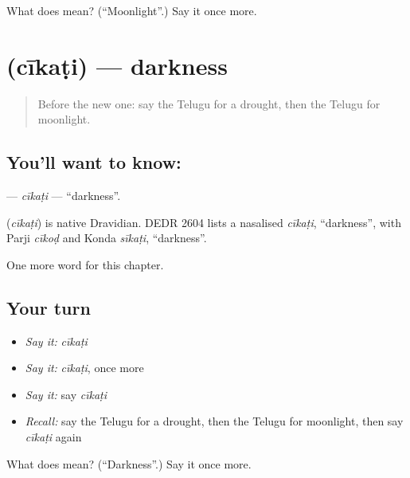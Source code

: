 \begin{tcolorbox}[breakable,colback=teal!4,colframe=teal!35!black,title={Before you move on}]
What does  mean? (\textquotedblleft{}Moonlight\textquotedblright{}.) Say it once more.
\end{tcolorbox}
\section[\texorpdfstring{\te{చీకటి} (cīkaṭi)}{చీకటి (cīkaṭi)}]{ (cīkaṭi) — darkness}

\label{lesson:TE-C267-cikati}



\begin{quote}
Before the new one: say the Telugu for a drought, then the Telugu for moonlight.
\end{quote}

\subsection*{You'll want to know: }
\textbf{} — \emph{cīkaṭi} — \textquotedblleft{}darkness\textquotedblright{}.

\begin{cousinweb}
\textbf{} (\emph{cīkaṭi}) is native Dravidian. DEDR 2604 lists a nasalised \emph{cīkaṭi}, \textquotedblleft{}darkness\textquotedblright{}, with Parji \emph{cīkoḍ} and Konda \emph{sīkaṭi}, \textquotedblleft{}darkness\textquotedblright{}.
\end{cousinweb}

\begin{grammarlens}[title={What you've built}]
One more word for this chapter.
\end{grammarlens}

\subsection*{Your turn}
\begin{itemize}
\raggedright
  \item \emph{Say it:} \emph{cīkaṭi}
  \item \emph{Say it:} \emph{cīkaṭi}, once more
  \item \emph{Say it:} say \emph{cīkaṭi}
  \item \emph{Recall:} say the Telugu for a drought, then the Telugu for moonlight, then say \emph{cīkaṭi} again
\end{itemize}

\begin{tcolorbox}[breakable,colback=teal!4,colframe=teal!35!black,title={Before you move on}]
What does  mean? (\textquotedblleft{}Darkness\textquotedblright{}.) Say it once more.
\end{tcolorbox}

